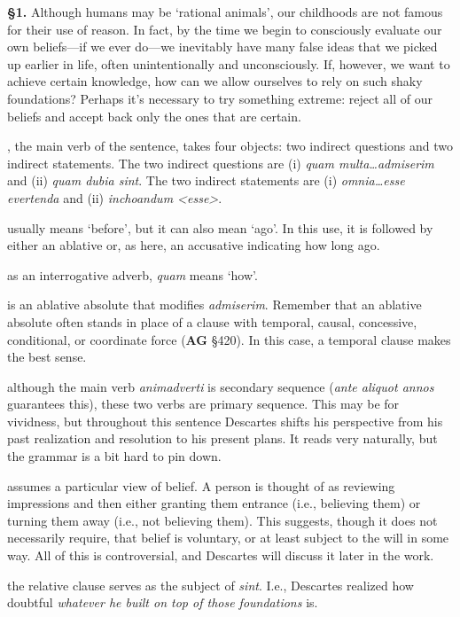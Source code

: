 \prenotes

\textbf{§1.} Although humans may be `rational animals', our childhoods are not famous for their use of reason. In fact, by the time we begin to consciously evaluate our own beliefs---if we ever do---we inevitably have many false ideas that we picked up earlier in life, often unintentionally and unconsciously. If, however, we want to achieve certain knowledge, how can we allow ourselves to rely on such shaky foundations? Perhaps it's necessary to try something extreme: reject all of our beliefs and accept back only the ones that are certain.

, the main verb of the sentence, takes four objects: two indirect questions and two indirect statements. The two indirect questions are (i) \textit{quam multa\dots admiserim} and (ii) \textit{quam dubia sint}. The two indirect statements are (i) \textit{omnia\dots esse evertenda} and (ii) \textit{inchoandum <esse>}.

 usually means `before', but it can also mean `ago'. In this use, it is followed by either an ablative or, as here, an accusative indicating how long ago.

 as an interrogative adverb, \textit{quam} means `how'.

 is an ablative absolute that modifies \textit{admiserim}. Remember that an ablative absolute often stands in place of a clause with temporal, causal, concessive, conditional, or coordinate force (\textbf{AG} §420). In this case, a temporal clause makes the best sense.

 although the main verb \textit{animadverti} is secondary sequence (\textit{ante aliquot annos} guarantees this), these two verbs are primary sequence. This may be for vividness, but throughout this sentence Descartes shifts his perspective from his past realization and resolution to his present plans. It reads very naturally, but the grammar is a bit hard to pin down.

 assumes a particular view of belief. A person is thought of as reviewing impressions and then either granting them entrance (i.e., believing them) or turning them away (i.e., not believing them). This suggests, though it does not necessarily require, that belief is voluntary, or at least subject to the will in some way. All of this is controversial, and Descartes will discuss it later in the work.

 the relative clause serves as the subject of \textit{sint}. I.e., Descartes realized how doubtful \textit{whatever he built on top of those foundations} is.

